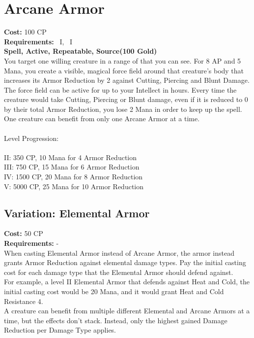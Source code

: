 \section{Arcane Armor}\label{spell:arcaneArmor}
\textbf{Cost:} 100 CP\\
\textbf{Requirements:}~ I,~ I\\
\textbf{Spell, Active, Repeatable, Source(100 Gold)}\\
You target one willing creature in a range of  that you can see.
For 8 AP and 5 Mana, you create a visible, magical force field around that creature's body that increases its Armor Reduction by 2 against Cutting, Piercing and Blunt Damage.
The force field can be active for up to your Intellect in hours.
Every time the creature would take Cutting, Piercing or Blunt damage, even if it is reduced to 0 by their total Armor Reduction, you lose 2 Mana in order to keep up the spell.
One creature can benefit from only one Arcane Armor at a time.\\
\\
Level Progression:\\
\\
II: 350 CP, 10 Mana for 4 Armor Reduction\\
III: 750 CP, 15 Mana for 6 Armor Reduction\\
IV: 1500 CP, 20 Mana for 8 Armor Reduction\\
V: 5000 CP, 25 Mana for 10 Armor Reduction\\

\subsection{Variation: Elemental Armor}\label{spell:elementalArmor}
\textbf{Cost:} 50 CP\\
\textbf{Requirements:} -\\
When casting Elemental Armor instead of Arcane Armor, the armor instead grants Armor Reduction against elemental damage types.
Pay the initial casting cost for each damage type that the Elemental Armor should defend against.\\
For example, a level II Elemental Armor that defends against Heat and Cold, the initial casting cost would be 20 Mana, and it would grant Heat and Cold Resistance 4.\\
A creature can benefit from multiple different Elemental and Arcane Armors at a time, but the effects don't stack.
Instead, only the highest gained Damage Reduction per Damage Type applies.